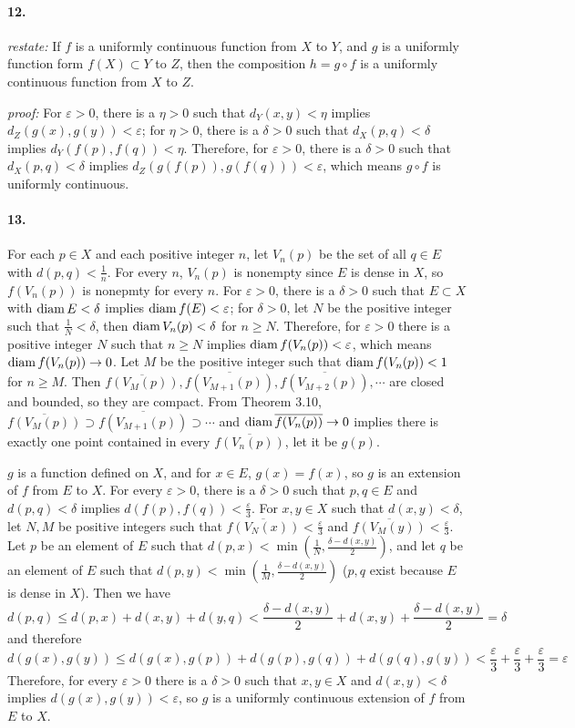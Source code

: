 \documentclass[a4paper]{article}
\begin{document}
\paragraph{12.}
\textit{restate:} If $f$ is a uniformly continuous function from $X$ to $Y$, and $g$ is a uniformly function form $f(X)\subset Y$ to $Z$, then the composition $h=g\circ f$ is a uniformly continuous function from $X$ to $Z$.
\smallskip

\textit{proof:} For $\varepsilon>0$, there is a $\eta>0$ such that $d_Y(x,y)<\eta$ implies $d_Z(g(x),g(y))<\varepsilon$; for $\eta>0$, there is a $\delta>0$ such that $d_X(p,q)<\delta$ implies $d_Y(f(p),f(q))<\eta$. Therefore, for $\varepsilon>0$, there is a $\delta>0$ such that $d_X(p,q)<\delta$ implies $d_Z(g(f(p)),g(f(q)))<\varepsilon$, which means $g\circ f$ is uniformly continuous. 

\paragraph{13.}
For each $p\in X$ and each positive integer $n$, let $V_n(p)$ be the set of all $q\in E$ with $d(p,q)<\frac{1}{n}$. For every $n$,\; $V_n(p)$ is nonempty since $E$ is dense in $X$, so $f(V_n(p))$ is nonepmty for every $n$. For $\varepsilon>0$, there is a $\delta>0$ such that $E\subset X$ with $\mathrm{diam}\,E<\delta$ implies $\mathrm{diam}\,f(E)<\varepsilon$; for $\delta>0$, let $N$ be the positive integer such that $\frac{1}{N}<\delta$, then $\mathrm{diam}\,V_n(p)<\delta$ for $n\geq N$. Therefore, for $\varepsilon>0$ there is a positive integer $N$ such that $n\geq N$ implies $\mathrm{diam}\,f(V_n(p))<\varepsilon$, which means $\mathrm{diam}\,f(V_n(p))\to0$. Let $M$ be the positive integer such that $\mathrm{diam}\,f(V_n(p))<1$ for $n\geq M$. Then $\overline{f(V_M(p))},\overline{f(V_{M+1}(p))},\overline{f(V_{M+2}(p))},\cdots$ are closed and bounded, so they are compact. From Theorem 3.10,\; $\overline{f(V_M(p))}\supset\overline{f(V_{M+1}(p))}\supset\cdots$ and $\mathrm{diam}\,\overline{f(V_n(p))}\to0$ implies there is exactly one point contained in every $\overline{f(V_n(p))}$, let it be $g(p)$.
\smallskip

$g$ is a function defined on $X$, and for $x\in E$,\; $g(x)=f(x)$, so $g$ is an extension of $f$ from $E$ to $X$. For every $\varepsilon>0$, there is a $\delta>0$ such that $p,q\in E$ and $d(p,q)<\delta$ implies $d(f(p),f(q))<\frac{\varepsilon}{3}$. For $x,y\in X$ such that $d(x,y)<\delta$, let $N,M$ be positive integers such that $\overline{f(V_N(x))}<\frac{\varepsilon}{3}$ and $\overline{f(V_M(y))}<\frac{\varepsilon}{3}$. Let $p$ be an element of $E$ such that $d(p,x)<\min(\frac{1}{N},\frac{\delta-d(x,y)}{2})$, and let $q$ be an element of $E$ such that $d(p,y)<\min(\frac{1}{M},\frac{\delta-d(x,y)}{2})$ ($p,q$ exist because $E$ is dense in $X$). Then we have
\[
d(p,q)\leq d(p,x)+d(x,y)+d(y,q)<\frac{\delta-d(x,y)}{2}+d(x,y)+\frac{\delta-d(x,y)}{2}=\delta
\]
and therefore
\[
d(g(x),g(y))\leq d(g(x),g(p))+d(g(p),g(q))+d(g(q),g(y))<\frac{\varepsilon}{3}+\frac{\varepsilon}{3}+\frac{\varepsilon}{3}=\varepsilon
\]
Therefore, for every $\varepsilon>0$ there is a $\delta>0$ such that $x,y\in X$ and $d(x,y)<\delta$ implies $d(g(x),g(y))<\varepsilon$, so $g$ is a uniformly continuous extension of $f$ from $E$ to $X$.
\smallskip
\end{document}
